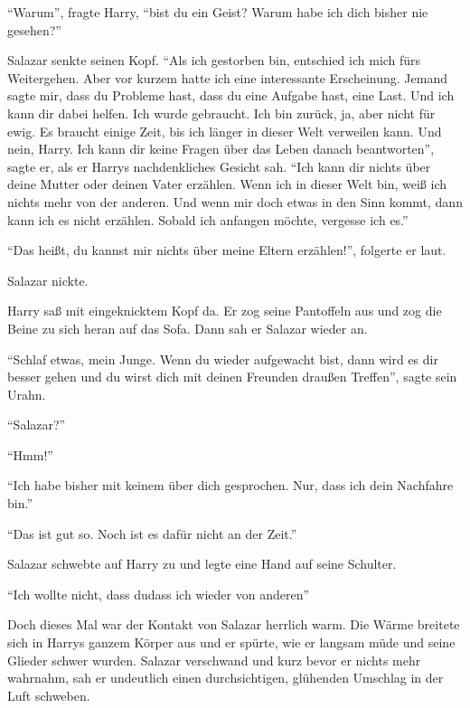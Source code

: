 \begin{rueckblick}
\enquote{Warum}, fragte Harry, \enquote{bist du ein Geist? Warum habe ich dich bisher nie gesehen?}

Salazar senkte seinen Kopf. \enquote{Als ich gestorben bin, entschied ich mich fürs Weitergehen. Aber vor kurzem hatte ich eine interessante Erscheinung.  Jemand sagte mir, dass du Probleme hast, dass du eine Aufgabe hast, eine Last. Und ich kann dir dabei helfen. Ich wurde gebraucht. Ich bin zurück, ja, aber nicht für ewig. Es braucht einige Zeit, bis ich länger in dieser Welt verweilen kann. Und nein, Harry. Ich kann dir keine Fragen über das Leben danach beantworten}, sagte er, als er Harrys nachdenkliches Gesicht sah. \enquote{Ich kann dir nichts über deine Mutter oder deinen Vater erzählen. Wenn ich in dieser Welt bin, weiß ich nichts mehr von der anderen. Und wenn mir doch etwas in den Sinn kommt, dann kann ich es nicht erzählen. Sobald ich anfangen möchte, vergesse ich es.}

\enquote{Das heißt, du kannst mir nichts über meine Eltern erzählen!}, folgerte er laut.

Salazar nickte.
\end{rueckblick}

Harry saß mit eingeknicktem Kopf da. Er zog seine Pantoffeln aus und zog die Beine zu sich heran auf das Sofa. Dann sah er Salazar wieder an.

\enquote{Schlaf etwas, mein Junge. Wenn du wieder aufgewacht bist, dann wird es dir besser gehen und du wirst dich mit deinen Freunden draußen Treffen}, sagte sein Urahn.

\enquote{Salazar?}

\enquote{Hmm!}

\enquote{Ich habe bisher mit keinem über dich gesprochen. Nur, dass ich dein Nachfahre bin.}

\enquote{Das ist gut so. Noch ist es dafür nicht an der Zeit.}

Salazar schwebte auf Harry zu und legte eine Hand auf seine Schulter.

\enquote{Ich wollte nicht, dass du\abs dass ich wieder von anderen\abs}

Doch dieses Mal war der Kontakt von Salazar herrlich warm. Die Wärme breitete sich in Harrys ganzem Körper aus und er spürte, wie er langsam müde und seine Glieder schwer wurden. Salazar verschwand und kurz bevor er nichts mehr wahrnahm, sah er undeutlich einen durchsichtigen, glühenden Umschlag in der Luft schweben.


